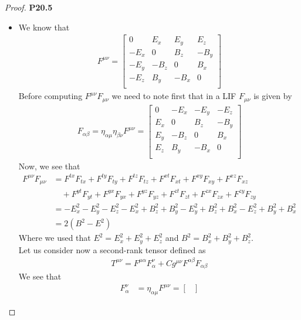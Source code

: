 \documentclass[11pt]{article}
\theoremstyle{definition}
\begin{document}
\cleardoublepage
\begin{proof}{\textbf{P20.5}}\\
\begin{itemize}
\item [\textbf{a.}] We know that
\begin{align*}
    F^{\mu\nu}
    = \begin{bmatrix}
        0 & E_x & E_y & E_z\\
        -E_x & 0 & B_z & -B_y\\ 
        -E_y & -B_z & 0 & B_x\\ 
        -E_z & B_y & -B_x & 0\\ 
    \end{bmatrix}
\end{align*}
Before computing $F^{\mu\nu}F_{\mu\nu}$ we need to note 
first that in a LIF $F_{\mu\nu}$ is given by
\begin{align*}
    F_{\alpha\beta} = \eta_{\alpha\mu} \eta_{\beta\nu}F^{\mu\nu}
    = \begin{bmatrix}
        0 & -E_x & -E_y & -E_z\\
        E_x & 0 & B_z & -B_y\\ 
        E_y & -B_z & 0 & B_x\\ 
        E_z & B_y & -B_x & 0\\ 
    \end{bmatrix}
\end{align*}
Now, we see that
\begin{align*}
    F^{\mu\nu}F_{\mu\nu}
    &= F^{tx}F_{tx} + F^{ty}F_{ty} + F^{tz}F_{tz}
    + F^{xt}F_{xt} + F^{xy}F_{xy} + F^{xz}F_{xz}\\
    &\quad + F^{yt}F_{yt} + F^{yx}F_{yx} + F^{yz}F_{yz}
    + F^{zt}F_{zt} + F^{zx}F_{zx} + F^{zy}F_{zy}\\
    &= -E_x^2 -E_y^2  -E_z^2
    -E_x^2 + B_z^2 + B_y^2
    -E_y^2 + B_z^2 + B_x^2
    -E_z^2 + B_y^2 + B_x^2\\
    &= 2(B^2 - E^2)
\end{align*}
Where we used that $E^2 = E_x^2 + E_y^2 + E_z^2$ and
$B^2 = B_x^2 + B_y^2 + B_z^2$.\\
Let us consider now a second-rank tensor defined as 
\begin{align*}
    T^{\mu\nu} = F^{\mu\alpha}F^{\nu}_{\alpha}
    + Cg^{\mu\nu}F^{\alpha\beta}F_{\alpha\beta}
\end{align*}
We see that
\begin{align*}
    F^{\nu}_{\alpha} &= \eta_{\alpha\mu} F^{\mu\nu}
    = \begin{bmatrix}

\end{bmatrix}
\end{align*}
\end{itemize}
\end{proof}
\end{document}
